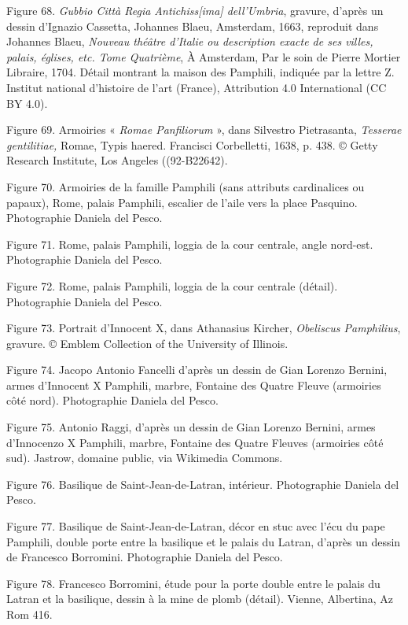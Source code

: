 \documentclass[12pt,twoside,openany]{book}
\begin{document}
Figure 68. \textit{Gubbio Città Regia Antichiss[ima] dell'Umbria}, gravure, d’après un dessin d’Ignazio Cassetta, Johannes Blaeu, Amsterdam, 1663, reproduit dans Johannes Blaeu, \textit{Nouveau théâtre d’Italie ou description exacte de ses villes, palais, églises, etc. Tome Quatrième}, À Amsterdam, Par le soin de Pierre Mortier Libraire, 1704. Détail montrant la maison des Pamphili, indiquée par la lettre Z. Institut national d’histoire de l’art (France), Attribution 4.0 International (CC BY 4.0).

Figure 69. Armoiries « \textit{Romae Panfiliorum} », dans Silvestro Pietrasanta, \textit{Tesserae gentilitiae,} Romae, Typis haered. Francisci Corbelletti, 1638, p. 438. © Getty Research Institute, Los Angeles ((92-B22642).

Figure 70. Armoiries de la famille Pamphili (sans attributs cardinalices ou papaux), Rome, palais Pamphili, escalier de l’aile vers la place Pasquino. Photographie Daniela del Pesco.

Figure 71. Rome, palais Pamphili, loggia de la cour centrale, angle nord-est. Photographie Daniela del Pesco.

Figure 72. Rome, palais Pamphili, loggia de la cour centrale (détail). Photographie Daniela del Pesco.

Figure 73. Portrait d’Innocent X, dans Athanasius Kircher, \textit{Obeliscus Pamphilius}, gravure. © Emblem Collection of the University of Illinois.

Figure 74. Jacopo Antonio Fancelli d’après un dessin de Gian Lorenzo Bernini, armes d’Innocent X Pamphili, marbre, Fontaine des Quatre Fleuve (armoiries côté nord). Photographie Daniela del Pesco.

Figure 75. Antonio Raggi, d’après un dessin de Gian Lorenzo Bernini, armes d’Innocenzo X Pamphili, marbre, Fontaine des Quatre Fleuves (armoiries côté sud). Jastrow, domaine public, via Wikimedia Commons.

Figure 76. Basilique de Saint-Jean-de-Latran, intérieur. Photographie Daniela del Pesco.

Figure 77. Basilique de Saint-Jean-de-Latran, décor en stuc avec l’écu du pape Pamphili, double porte entre la basilique et le palais du Latran, d’après un dessin de Francesco Borromini. Photographie Daniela del Pesco.

Figure 78. Francesco Borromini, étude pour la porte double entre le palais du Latran et la basilique, dessin à la mine de plomb (détail). Vienne, Albertina, Az Rom 416.
\end{document}
